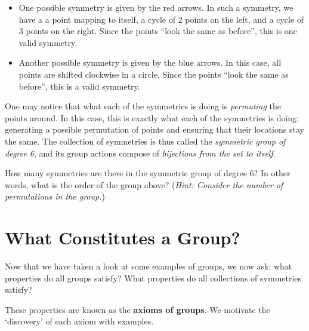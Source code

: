 \begin{itemize}
    \item One possible symmetry is given by the red arrows. In such a symmetry, we have a a point mapping to itself, a cycle of 2 points on the left, and a cycle of 3 points on the right. Since the points ``look the same as before'', this is one valid symmetry.
    \item Another possible symmetry is given by the blue arrows. In this case, all points are shifted clockwise in a circle. Since the points ``look the same as before'', this is a valid symmetry.
\end{itemize}

One may notice that what each of the symmetries is doing is \textit{permuting} the points around. In this case, this is exactly what each of the symmetries is doing: generating a possible permutation of points and ensuring that their locations stay the same. The collection of symmetries is thus called the \textit{symmetric group of degree 6}, and its group actions compose of \textit{bijections from the set to itself}.

\begin{exercise}
    How many symmetries are there in the symmetric group of degree 6? In other words, what is the order of the group above?\newline
    (\textit{Hint: Consider the number of permutations in the group.})
\end{exercise}

\section{What Constitutes a Group?}
Now that we have taken a look at some examples of groups, we now ask: what properties do all groups satisfy? What properties do all collections of symmetries satisfy?

These properties are known as the \textbf{axioms of groups}. We motivate the `discovery' of each axiom with examples.

\begin{figure}
    \centering
\end{figure}

